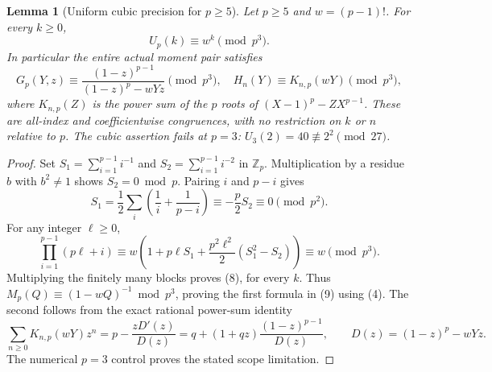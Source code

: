\documentclass[11pt]{article}
\newtheorem{lemma}{Lemma}\newtheorem{proposition}[lemma]{Proposition}\newtheorem{theorem}[lemma]{Theorem}\newtheorem{corollary}[lemma]{Corollary}
\begin{document}
\begin{lemma}[Uniform cubic precision for $p\ge5$]\label{lem:cubic}
Let $p\ge5$ and $w=(p-1)!$. For every $k\ge0$,
\[
                        U_p(k)\equiv w^k\pmod{p^3}.       \tag{8}
\]
In particular the entire actual moment pair satisfies
\[
 G_p(Y,z)\equiv\frac{(1-z)^{p-1}}{(1-z)^p-wYz}\pmod{p^3},
 \quad
 H_n(Y)\equiv K_{n,p}(wY)\pmod{p^3},                     \tag{9}
\]
where $K_{n,p}(Z)$ is the power sum of the $p$ roots of
$(X-1)^p-ZX^{p-1}$. These are all-index and
coefficientwise congruences, with no restriction on $k$ or $n$
relative to $p$.
The cubic assertion fails at $p=3$:
$U_3(2)=40\not\equiv 2^2\pmod {27}$.
\end{lemma}
\begin{proof}
Set $S_1=\sum_{i=1}^{p-1}i^{-1}$ and
$S_2=\sum_{i=1}^{p-1}i^{-2}$ in $\mathbb Z_p$.
Multiplication by a residue $b$ with $b^2\ne1$ shows
$S_2=0\bmod p$. Pairing $i$ and $p-i$ gives
\[
 S_1=\frac12\sum_i\left(\frac1i+\frac1{p-i}\right)
           \equiv-\frac p2S_2\equiv0\pmod {p^2}.
\]
For any integer $\ell\ge0$,
\[
 \prod_{i=1}^{p-1}(p\ell+i)
 \equiv w\left(1+p\ell S_1+
          \frac{p^2\ell^2}{2}(S_1^2-S_2)\right)
 \equiv w\pmod {p^3}.
\]
Multiplying the finitely many blocks proves (8), for every $k$.
Thus $M_p(Q)\equiv(1-wQ)^{-1}\bmod p^3$, proving the
first formula in (9) using (4).
The second follows from the exact rational power-sum identity
\[
 \sum_{n\ge0}K_{n,p}(wY)z^n
  =p-\frac{zD'(z)}{D(z)}
  =q+(1+qz)\frac{(1-z)^{p-1}}{D(z)},\qquad
 D(z)=(1-z)^p-wYz.
\]
The numerical $p=3$ control proves the stated scope limitation.
\end{proof}
\end{document}
